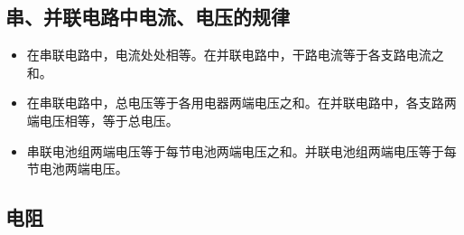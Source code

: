 \subsection{串、并联电路中电流、电压的规律}
\begin{itemize}
\item 在串联电路中，电流处处相等。在并联电路中，干路电流等于各支路电流之和。
\item 在串联电路中，总电压等于各用电器两端电压之和。在并联电路中，各支路两端电压相等，等于总电压。
\item 串联电池组两端电压等于每节电池两端电压之和。并联电池组两端电压等于每节电池两端电压。
\end{itemize}

\subsection{电阻}
